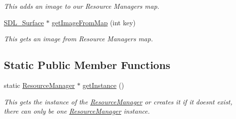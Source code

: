 \begin{DoxyCompactItemize}
\begin{DoxyCompactList}\small\item\em This adds an image to our Resource Manager\textquotesingle{}s map. \end{DoxyCompactList}\item 
\mbox{\hyperlink{struct_s_d_l___surface}{S\+D\+L\+\_\+\+Surface}} $\ast$ \mbox{\hyperlink{class_resource_manager_aa4d2ecc550067337c2056d42dafca39a}{get\+Image\+From\+Map}} (int key)
\begin{DoxyCompactList}\small\item\em This gets an image from Resource Manager\textquotesingle{}s map. \end{DoxyCompactList}\end{DoxyCompactItemize}
\subsection*{Static Public Member Functions}
\begin{DoxyCompactItemize}
\item 
static \mbox{\hyperlink{class_resource_manager}{Resource\+Manager}} $\ast$ \mbox{\hyperlink{class_resource_manager_a41943f7fb045ad54f1e24da7c6046502}{get\+Instance}} ()
\begin{DoxyCompactList}\small\item\em This gets the instance of the \mbox{\hyperlink{class_resource_manager}{Resource\+Manager}} or creates it if it doesn\textquotesingle{}t exist, there can only be one \mbox{\hyperlink{class_resource_manager}{Resource\+Manager}} instance. \end{DoxyCompactList}\end{DoxyCompactItemize}
